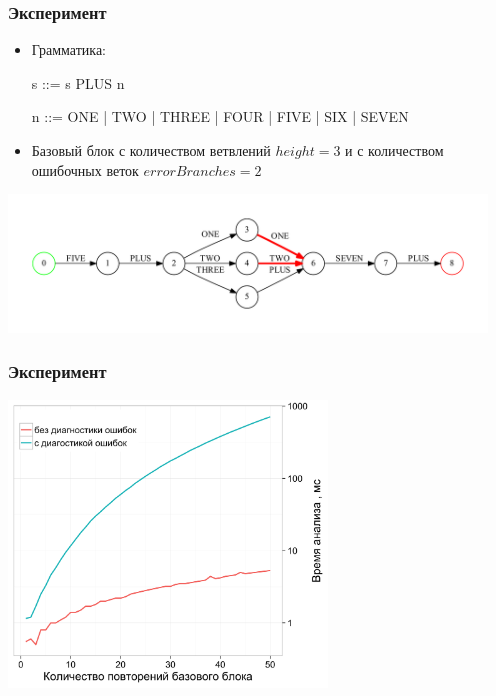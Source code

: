 \documentclass{beamer}
\begin{document}
\begin{frame}[t]
  \transwipe[direction=90]
  \frametitle{Эксперимент}
  \begin{itemize}
  
    \item Грамматика:
    
     s ::= s PLUS n
     
     n ::= ONE | TWO | THREE | FOUR | FIVE | SIX | SEVEN
     
    \item Базовый блок с количеством ветвлений $height = 3$ и с количеством ошибочных веток $errorBranches = 2$
     
    \end{itemize}
    
    \includegraphics[width=360pt]{pictures/errorBlock.pdf}
     

\end{frame}

\begin{frame}[t]
  \transwipe[direction=90]
  \frametitle{Эксперимент}
    \begin{center}
        \includegraphics[width=240pt]{pictures/witherror.png}
    \end{center}

\end{frame}
\end{document}
